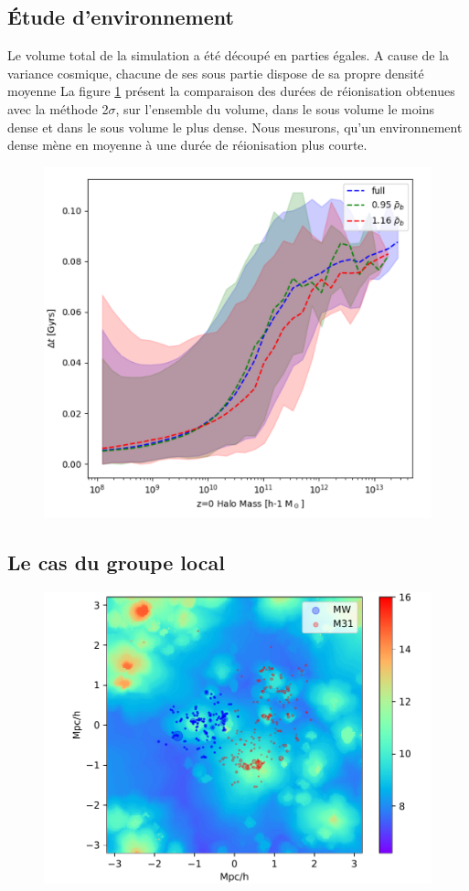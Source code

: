 \clearpage
\subsection{Étude d’environnement}

Le volume total de la simulation a été découpé en parties égales.
A cause de la variance cosmique, chacune de ses sous partie dispose de sa propre densité moyenne
La figure \ref{fig:CODA_environnement} présent la comparaison des durées de réionisation obtenues avec la méthode 2$\sigma$, sur l'ensemble du volume, dans le sous volume le moins dense et dans le sous volume le plus dense.
Nous mesurons, qu'un environnement dense mène en moyenne à une durée de réionisation plus courte.

\begin{figure}
		\centering
		\includegraphics[width=.95\linewidth]{img/05/median_dt_envir.pdf}
        \caption[influence de l'environement]{
		\label{fig:CODA_environnement}}
\end{figure}

\subsection{Le cas du groupe local}
\begin{figure}
		\centering
		\includegraphics[width=.95\linewidth]{img/05/map_LG.pdf}
        \caption[Groupe local]{
		\label{fig:CODA_LG}}
\end{figure}

